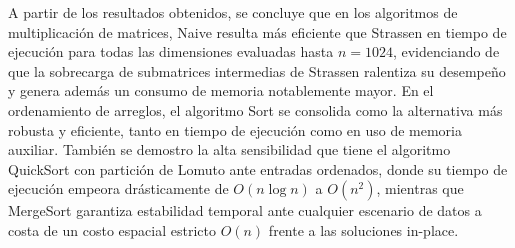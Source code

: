 A partir de los resultados obtenidos, se concluye que en los
algoritmos de multiplicación de matrices, Naive resulta más
eficiente que Strassen en tiempo de ejecución para todas las
dimensiones evaluadas hasta $n = 1024$, evidenciando de que la
sobrecarga de submatrices intermedias de Strassen ralentiza su
desempeño y genera además un consumo de memoria notablemente mayor.
En el ordenamiento de arreglos, el algoritmo Sort se consolida como
la alternativa más robusta y eficiente, tanto en tiempo de ejecución
como en uso de memoria auxiliar. También se demostro la alta
sensibilidad que tiene el algoritmo QuickSort con partición de Lomuto
ante entradas ordenados, donde su tiempo de ejecución empeora drásticamente
de $O(n \log n)$ a $O(n^2)$, mientras que MergeSort garantiza
estabilidad temporal ante cualquier escenario de datos a costa de
un costo espacial estricto $O(n)$ frente a las soluciones in-place.